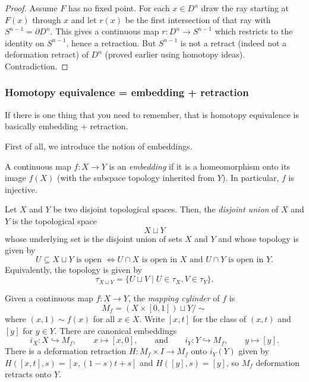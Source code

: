 \begin{proof}
Assume $F$ has no fixed point. For each $x\in D^n$ draw the ray starting at $F(x)$ through $x$ and let $r(x)$ be the first intersection of that ray with $S^{n-1}=\partial D^n$. This gives a continuous map $r\colon D^n\to S^{n-1}$ which restricts to the identity on $S^{n-1}$, hence a retraction. But $S^{n-1}$ is not a retract (indeed not a deformation retract) of $D^n$ (proved earlier using homotopy ideas). Contradiction.
\end{proof}



\subsubsection*{Homotopy equivalence = embedding + retraction}



If there is one thing that you need to remember, that is homotopy equivalence is basically embedding + retraction.

First of all, we introduce the notion of embeddings.
\begin{definition}[Embedding]
A continuous map $f:X\to Y$ is an \emph{embedding} if it is a homeomorphism onto its image $f(X)$ (with the subspace topology inherited from $Y$). In particular, $f$ is injective.
\end{definition}

\begin{definition}
  Let $X$ and $Y$ be two disjoint topological spaces. Then, the \emph{disjoint union} of $X$ and $Y$ is the topological space
  \[X\sqcup Y
  \]
  whose underlying set is the disjoint union of sets $X$ and $Y$ and whose topology is given by
  \[U\subseteq X\sqcup Y \text{ is open } \iff U\cap X \text{ is open in } X \text{ and } U\cap Y \text{ is open in } Y.
  \]
  Equivalently, the topology is given by
  \[\tau_{X\sqcup Y}=\{U\sqcup V \mid U\in \tau_X, V\in \tau_Y\}.
  \]
\end{definition}

\begin{definition}
Given a continuous map $f:X\to Y$, the \emph{mapping cylinder} of $f$ is
\[
M_f=(X\times[0,1])\sqcup Y \big/ \sim
\]
where $(x,1)\sim f(x)$ for all $x\in X$.
Write $[x,t]$ for the class of $(x,t)$ and $[y]$ for $y\in Y$. There are canonical embeddings
\[
i_X:X\hookrightarrow M_f,\qquad x\mapsto [x,0], \qquad\text{and}\qquad
i_Y:Y\hookrightarrow M_f,\qquad y\mapsto [y].
\]
There is a deformation retraction $H:M_f\times I\to M_f$ onto $i_Y(Y)$ given by
$H([x,t],s)=[x,(1-s)t+ s]$ and $H([y],s)=[y]$, so $M_f$ deformation retracts onto $Y$.
\end{definition}

